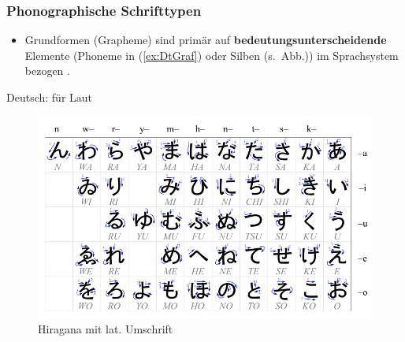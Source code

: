 \begin{frame}
\frametitle{Phonographische Schrifttypen}



\begin{itemize}
	\item Grundformen (\zB Grapheme) sind primär auf \textbf{bedeutungsunterscheidende} Elemente (\zB Phoneme in (\ref{ex:DtGraf}) oder Silben (s.\ Abb.)) im Sprachsystem bezogen \citep[vgl.][76--77]{Duerscheid04a}.
\end{itemize}
	 
\hfill 	 
\begin{minipage}{.47\textwidth}
	\ea\label{ex:DtGraf} Deutsch:
	 für Laut \textipa{[k]}
	\z 
\end{minipage}%
\begin{minipage}{.5\textwidth}
\begin{figure}
	\centering
	
	\includegraphics[scale=.2]{material/05Table_hiragana}
	\caption{Hiragana mit lat. Umschrift}
	\label{Hiragana}
\end{figure}
\end{minipage}

\end{frame}



